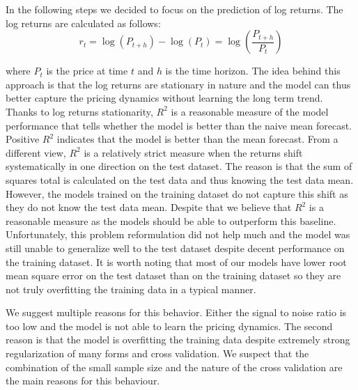 In the following steps we decided to focus on the prediction
of log returns. The log returns are calculated as follows:
\begin{equation}\label{eq:log_returns}
    r_t = \log(P_{t+h}) - \log(P_t) = \log\left(\frac{P_{t+h}}{P_t}\right)
\end{equation}

where $P_t$ is the price at time $t$ and $h$ is the time horizon.
The idea behind this approach is that the log returns are stationary in nature
and the model can thus better capture
the pricing dynamics without learning the long term trend.
Thanks to log returns stationarity, 
$R^2$ is a reasonable measure of the model performance that
tells whether the model is better than the naive mean forecast.
Positive $R^2$ indicates that the model is better than the mean forecast.
From a different view, $R^2$ is a relatively strict measure
when the returns shift systematically in one direction on the test dataset.
The reason is that the sum of squares total
is calculated on the test data and thus knowing the test data mean.
However, the models trained on the training dataset do not 
capture this shift as they do not know the test data mean.
Despite that we believe that $R^2$ is a reasonable measure
as the models should be able to outperform this baseline.
Unfortunately, this problem reformulation 
did not help much and the model was still
unable to generalize well to the test dataset despite
decent performance on the training dataset.
It is worth noting that most of our
models have lower root mean square error on the test
dataset than on the training dataset so they 
are not truly overfitting the training data in a typical manner.



We suggest multiple reasons for this behavior. 
Either the signal to noise ratio is too low
and the model is not able 
to learn the pricing dynamics. 
The second reason is that the model is overfitting the training
data despite extremely strong regularization of many forms and
cross validation. We suspect
that the combination of the small sample size and the
nature of the cross validation 
are the main reasons for this behaviour. 

